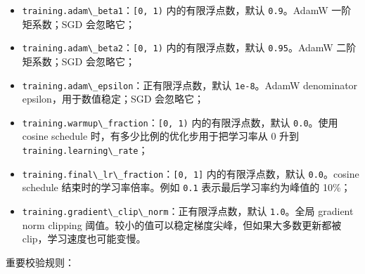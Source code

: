 \documentclass[
]{ctexart}
\newcommand{\passthrough}[1]{#1}
\begin{document}
\begin{itemize}
  \passthrough{\lstinline!0.01!} 的小值；
\item
  \passthrough{\lstinline!training.adam\_beta1!}：\passthrough{\lstinline![0, 1)!}
  内的有限浮点数，默认 \passthrough{\lstinline!0.9!}。AdamW
  一阶矩系数；SGD 会忽略它；
\item
  \passthrough{\lstinline!training.adam\_beta2!}：\passthrough{\lstinline![0, 1)!}
  内的有限浮点数，默认 \passthrough{\lstinline!0.95!}。AdamW
  二阶矩系数；SGD 会忽略它；
\item
  \passthrough{\lstinline!training.adam\_epsilon!}：正有限浮点数，默认
  \passthrough{\lstinline!1e-8!}。AdamW denominator
  epsilon，用于数值稳定；SGD 会忽略它；
\item
  \passthrough{\lstinline!training.warmup\_fraction!}：\passthrough{\lstinline![0, 1)!}
  内的有限浮点数，默认 \passthrough{\lstinline!0.0!}。使用 cosine
  schedule 时，有多少比例的优化步用于把学习率从 0 升到
  \passthrough{\lstinline!training.learning\_rate!}；
\item
  \passthrough{\lstinline!training.final\_lr\_fraction!}：\passthrough{\lstinline![0, 1]!}
  内的有限浮点数，默认 \passthrough{\lstinline!0.0!}。cosine schedule
  结束时的学习率倍率。例如 \passthrough{\lstinline!0.1!}
  表示最后学习率约为峰值的 10\%；
\item
  \passthrough{\lstinline!training.gradient\_clip\_norm!}：正有限浮点数，默认
  \passthrough{\lstinline!1.0!}。全局 gradient norm clipping
  阈值。较小的值可以稳定梯度尖峰，但如果大多数更新都被
  clip，学习速度也可能变慢。
\end{itemize}

重要校验规则：
\end{document}
